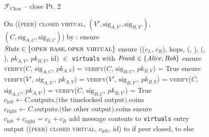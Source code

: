\begin{figure}[H]
  \begin{systembox}{$\mathcal{F}_{\mathrm{Chan}}$ -- close Pt. 2}
    \begin{algorithmic}[1]
      \State On (\textsc{(peer) closed virtual}, $(V', \mathrm{sig}_{A, V'},
      \mathrm{sig}_{B, V'})$, $(C, \mathrm{sig}_{A, C}, \mathrm{sig}_{B, C})$)
      by \charlie:
      \Indent
        \State ensure $\mathit{State} \in \{\textsc{open base}, \textsc{open
        virtual}\}$
        \State ensure (($c_L$, $c_R$), hops, (\charlie, \dave), (\frank,
        \george), $pk_{A, V}$, $pk_{B, V}$, id) $\in$ \texttt{virtuals}
        with $\mathit{Frank} \in \{\mathit{Alice}, \mathit{Bob}\}$ 
          \State ensure \textsc{verify}($C$, $\mathrm{sig}_{A, C}$, $pk_{A, V}$)
          = \textsc{verify}($C$, $\mathrm{sig}_{B, C}$, $pk_{B, V}$) = True
        \Else
          \State ensure \textsc{verify}($V'$, $\mathrm{sig}_{A, V'}$, $pk_{A,
          V}$) = \textsc{verify}($V'$, $\mathrm{sig}_{B, V'}$, $pk_{B, V}$) =
          \textsc{verify}($C$, $\mathrm{sig}_{A, C}$, $pk_{A, V'}$) =
          \textsc{verify}($C$, $\mathrm{sig}_{B, C}$, $pk_{B, V'}$) = True
        \EndIf
        \State $c_{\mathrm{left}} \gets C\text{.outputs.(the timelocked
        output).coins}$
        \State $c_{\mathrm{right}} \gets C\text{.outputs.(the other
        output).coins}$
        \State ensure $c_{\mathrm{left}} + c_{\mathrm{right}} = c_L + c_R$
        \State add message contents to \texttt{virtuals} entry
        \State output (\textsc{(peer) closed virtual}, $c_{\mathrm{left}}$, id) to
        \george if peer closed, to \frank else
      \EndIndent
    \end{algorithmic}
  \end{systembox}
  \caption{}
  \label{code:functionality:chan:skeleton:close:pt2}
\end{figure}

